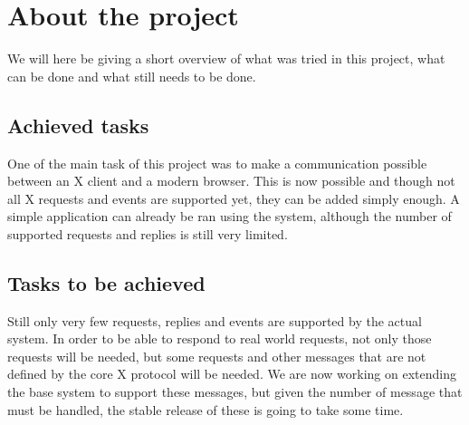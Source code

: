 \section{About the project}
We will here be giving a short overview of what was tried in this project, 
what can be done and what still needs to be done.
\subsection{Achieved tasks}
One of the main task of this project was to make a communication possible 
between an X client and a modern browser. This is now possible and though 
not all X requests and events are supported yet, they can be added 
simply enough.
A simple application can already be ran using the system, although the 
number of supported requests and replies is still very limited.
\subsection{Tasks to be achieved}
Still only very few requests, replies and events are supported by the 
actual system. In order to be able to respond to real world requests, 
not only those requests will be needed, but some requests and 
other messages that are not defined by the core X protocol will 
be needed. We are now working on extending the base system to support 
these messages, but given the number of message that must be handled, 
the stable release of these is going to take some time.
